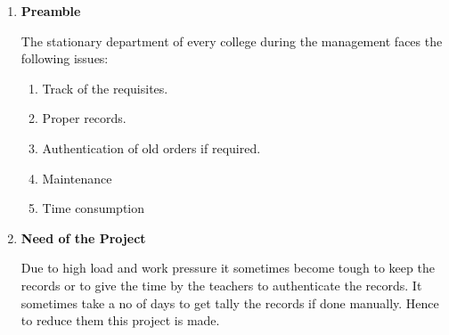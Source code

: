 \documentclass[12pt]{report}
\renewcommand{\_}{\kern-1.5pt\textunderscore\kern-1.5pt}
\begin{document}
\vspace{\baselineskip}
\begin{enumerate}
	\item {\fontsize{14pt}{16.8pt}\selectfont \textbf{\textcolor[HTML]{0D0D0D}{Preamble}}\par}\par


\vspace{\baselineskip}
\textcolor[HTML]{0D0D0D}{The stationary department of every college during the management faces the following issues:}\par

\begin{enumerate}
	\item \textcolor[HTML]{0D0D0D}{Track of the requisites.}\par

	\item \textcolor[HTML]{0D0D0D}{Proper records.}\par

	\item \textcolor[HTML]{0D0D0D}{Authentication of old orders if required.}\par

	\item \textcolor[HTML]{0D0D0D}{Maintenance }\par

	\item \textcolor[HTML]{0D0D0D}{Time consumption}\par

\textcolor[HTML]{0D0D0D}{ }\par


\vspace{\baselineskip}

\end{enumerate}
	\item {\fontsize{14pt}{16.8pt}\selectfont \textbf{\textcolor[HTML]{0D0D0D}{Need of the Project}}\par}\par


\vspace{\baselineskip}
\begin{justify}
\textcolor[HTML]{0D0D0D}{Due to high load and work pressure it sometimes become tough to keep the records or to give the time by the teachers to authenticate the records. It sometimes take a no of days to get tally the records if done manually. Hence to reduce them this project is made.}
\end{justify}\par



\end{enumerate}
\end{document}
